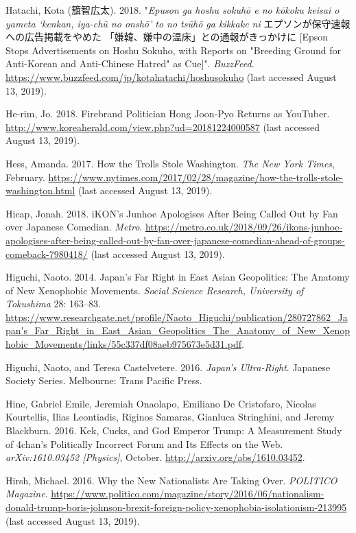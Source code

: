 \documentclass[10pt,british,A4paper,oneside]{memoir}
\begin{document}
\hypertarget{ref-hatachi__2018}{}
Hatachi, Kota (籏智広太). 2018. "\emph{Epuson ga hoshu sokuhō e no kōkoku keisai o yameta `kenkan, iya-chū no onshō' to no tsūhō ga kikkake ni} エプソンが保守速報への広告掲載をやめた 「嫌韓、嫌中の温床」との通報がきっかけに [Epson Stops Advertisements on Hoshu Sokuho, with Reports on "Breeding Ground for Anti-Korean and Anti-Chinese Hatred" as Cue]". \emph{BuzzFeed}.
\url{https://www.buzzfeed.com/jp/kotahatachi/hoshusokuho} (last accessed August 13, 2019).

\hypertarget{ref-he-rim_firebrand_2018}{}
He-rim, Jo. 2018. Firebrand Politician Hong Joon-Pyo Returns as
YouTuber. \url{http://www.koreaherald.com/view.php?ud=20181224000587} (last accessed August 13, 2019).

\hypertarget{ref-hess_how_2017}{}
Hess, Amanda. 2017. How the Trolls Stole Washington. \emph{The New York
Times}, February.
\url{https://www.nytimes.com/2017/02/28/magazine/how-the-trolls-stole-washington.html} (last accessed August 13, 2019).

\hypertarget{ref-hicap_ikons_2018}{}
Hicap, Jonah. 2018. iKON's Junhoe Apologises After Being Called Out by
Fan over Japanese Comedian. \emph{Metro}.
\url{https://metro.co.uk/2018/09/26/ikons-junhoe-apologises-after-being-called-out-by-fan-over-japanese-comedian-ahead-of-groups-comeback-7980418/} (last accessed August 13, 2019).

\hypertarget{ref-higuchi_japans_2014}{}
Higuchi, Naoto. 2014. Japan's Far Right in East Asian Geopolitics: The
Anatomy of New Xenophobic Movements. \emph{Social Science Research,
University of Tokushima} 28: 163--83.
\url{https://www.researchgate.net/profile/Naoto_Higuchi/publication/280727862_Japan's_Far_Right_in_East_Asian_Geopolitics_The_Anatomy_of_New_Xenophobic_Movements/links/55c337df08aeb975673e5d31.pdf}.

\hypertarget{ref-higuchi_japans_2016}{}
Higuchi, Naoto, and Teresa Castelvetere. 2016. \emph{Japan's
Ultra-Right}. Japanese Society Series. Melbourne: Trans Pacific Press.

\hypertarget{ref-hine_kek_2016}{}
Hine, Gabriel Emile, Jeremiah Onaolapo, Emiliano De Cristofaro, Nicolas
Kourtellis, Ilias Leontiadis, Riginos Samaras, Gianluca Stringhini, and
Jeremy Blackburn. 2016. Kek, Cucks, and God Emperor Trump: A Measurement
Study of 4chan's Politically Incorrect Forum and Its Effects on the Web.
\emph{arXiv:1610.03452 {[}Physics{]}}, October.
\url{http://arxiv.org/abs/1610.03452}.

\hypertarget{ref-hirsh_why_2016}{}
Hirsh, Michael. 2016. Why the New Nationalists Are Taking Over.
\emph{POLITICO Magazine}.
\url{https://www.politico.com/magazine/story/2016/06/nationalism-donald-trump-boris-johnson-brexit-foreign-policy-xenophobia-isolationism-213995} (last accessed August 13, 2019).
\end{document}
